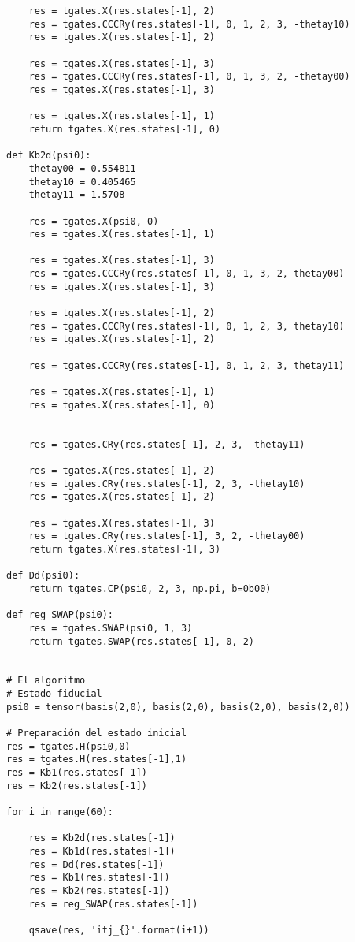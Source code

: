 \begin{verbatim}
    res = tgates.X(res.states[-1], 2)
    res = tgates.CCCRy(res.states[-1], 0, 1, 2, 3, -thetay10)
    res = tgates.X(res.states[-1], 2)

    res = tgates.X(res.states[-1], 3)
    res = tgates.CCCRy(res.states[-1], 0, 1, 3, 2, -thetay00)
    res = tgates.X(res.states[-1], 3)

    res = tgates.X(res.states[-1], 1)
    return tgates.X(res.states[-1], 0)

def Kb2d(psi0):
    thetay00 = 0.554811
    thetay10 = 0.405465
    thetay11 = 1.5708

    res = tgates.X(psi0, 0)
    res = tgates.X(res.states[-1], 1)

    res = tgates.X(res.states[-1], 3)
    res = tgates.CCCRy(res.states[-1], 0, 1, 3, 2, thetay00)
    res = tgates.X(res.states[-1], 3)

    res = tgates.X(res.states[-1], 2)
    res = tgates.CCCRy(res.states[-1], 0, 1, 2, 3, thetay10)
    res = tgates.X(res.states[-1], 2)

    res = tgates.CCCRy(res.states[-1], 0, 1, 2, 3, thetay11)

    res = tgates.X(res.states[-1], 1)
    res = tgates.X(res.states[-1], 0)


    res = tgates.CRy(res.states[-1], 2, 3, -thetay11)

    res = tgates.X(res.states[-1], 2)
    res = tgates.CRy(res.states[-1], 2, 3, -thetay10)
    res = tgates.X(res.states[-1], 2)

    res = tgates.X(res.states[-1], 3)
    res = tgates.CRy(res.states[-1], 3, 2, -thetay00)
    return tgates.X(res.states[-1], 3)

def Dd(psi0):
    return tgates.CP(psi0, 2, 3, np.pi, b=0b00)

def reg_SWAP(psi0):
    res = tgates.SWAP(psi0, 1, 3)
    return tgates.SWAP(res.states[-1], 0, 2)


# El algoritmo
# Estado fiducial
psi0 = tensor(basis(2,0), basis(2,0), basis(2,0), basis(2,0))

# Preparación del estado inicial
res = tgates.H(psi0,0)
res = tgates.H(res.states[-1],1)
res = Kb1(res.states[-1])
res = Kb2(res.states[-1])

for i in range(60):
    
    res = Kb2d(res.states[-1])
    res = Kb1d(res.states[-1])
    res = Dd(res.states[-1])
    res = Kb1(res.states[-1])
    res = Kb2(res.states[-1])
    res = reg_SWAP(res.states[-1])
    
    qsave(res, 'itj_{}'.format(i+1))
\end{verbatim}


